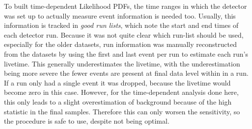 To built time-dependent Likelihood PDFs, the time ranges in which the detector was set up to actually measure event information is needed too.
Usually, this information is tracked in \emph{good run lists}, which note the start and end times of each detector run.
Because it was not quite clear which run-list should be used, especially for the older datasets, run information was manually reconstructed from the datasets by using the first and last event per run to estimate each run's livetime.
This generally underestimates the livetime, with the underestimation being more severe the fewer events are present at final data level within in a run.
If a run only had a single event it was dropped, because the livetime would become zero in this case.
However, for the time-dependent analysis done here, this only leads to a slight overestimation of background because of the high statistic in the final samples.
Therefore this can only worsen the sensitivity, so the procedure is safe to use, despite not being optimal.

